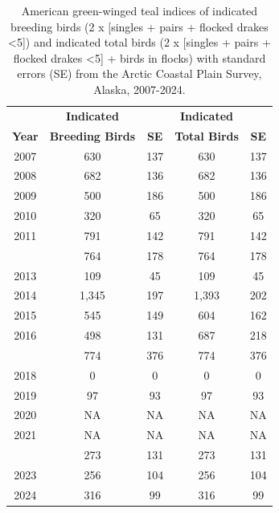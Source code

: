 \documentclass[
]{article}
\begin{document}
\begingroup\fontsize{10}{12}\selectfont

\begin{longtable}[t]{ccccc}

\caption{\label{tbl-GWTE}American green-winged teal indices of indicated
breeding birds (2 x {[}singles + pairs + flocked drakes \textless5{]})
and indicated total birds (2 x {[}singles + pairs + flocked drakes
\textless5{]} + birds in flocks) with standard errors (SE) from the
Arctic Coastal Plain Survey, Alaska, 2007-2024.}

\tabularnewline

\\
\toprule
\multicolumn{1}{c}{\textbf{ }} & \multicolumn{1}{c}{\textbf{Indicated}} & \multicolumn{1}{c}{\textbf{ }} & \multicolumn{1}{c}{\textbf{Indicated}} & \multicolumn{1}{c}{\textbf{ }} \\
\cmidrule(l{3pt}r{3pt}){2-2} \cmidrule(l{3pt}r{3pt}){4-4}
\textbf{Year} & \textbf{Breeding Birds} & \textbf{SE} & \textbf{Total Birds} & \textbf{SE}\\
\midrule
2007 & 630 & 137 & 630 & 137\\
2008 & 682 & 136 & 682 & 136\\
2009 & 500 & 186 & 500 & 186\\
2010 & 320 & 65 & 320 & 65\\
2011 & 791 & 142 & 791 & 142\\
\addlinespace
2012 & 764 & 178 & 764 & 178\\
2013 & 109 & 45 & 109 & 45\\
2014 & 1,345 & 197 & 1,393 & 202\\
2015 & 545 & 149 & 604 & 162\\
2016 & 498 & 131 & 687 & 218\\
\addlinespace
2017 & 774 & 376 & 774 & 376\\
2018 & 0 & 0 & 0 & 0\\
2019 & 97 & 93 & 97 & 93\\
2020 & NA & NA & NA & NA\\
2021 & NA & NA & NA & NA\\
\addlinespace
2022 & 273 & 131 & 273 & 131\\
2023 & 256 & 104 & 256 & 104\\
2024 & 316 & 99 & 316 & 99\\
\bottomrule

\end{longtable}

\endgroup{}

\newpage{}
\end{document}
